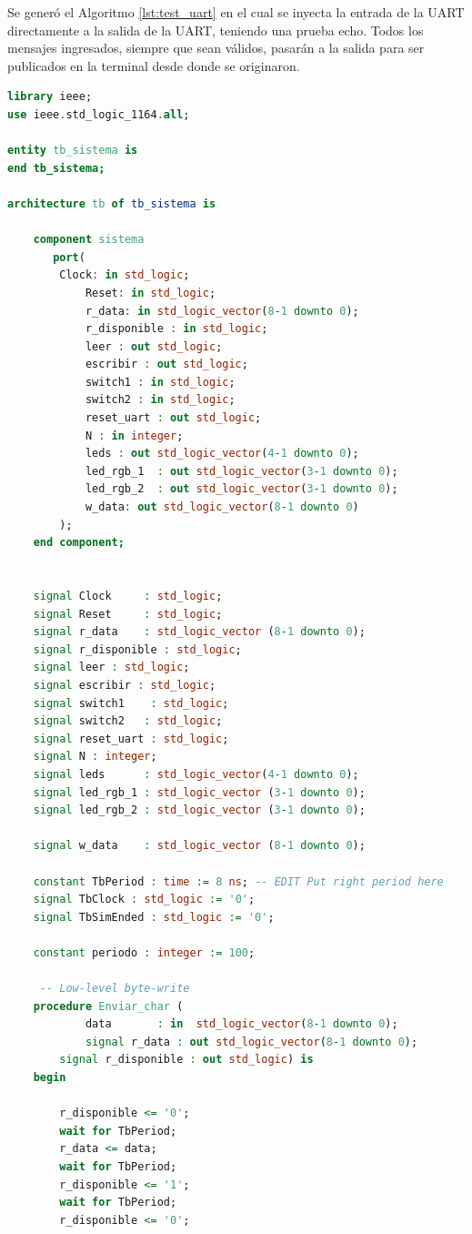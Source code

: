 		Se generó el Algoritmo \ref{lst:test_uart} en el cual se inyecta la entrada de la UART directamente a la salida de la UART, teniendo una prueba echo. Todos los mensajes ingresados, siempre que sean válidos, pasarán a la salida para ser publicados en la terminal desde donde se originaron.
			
		\begin{lstlisting}[language = vhdl,caption=Testbench del módulo UART,label={lst:test_uart}] 
library ieee;
use ieee.std_logic_1164.all;

entity tb_sistema is
end tb_sistema;

architecture tb of tb_sistema is

    component sistema
       port(
		Clock: in std_logic;
        	Reset: in std_logic;
			r_data: in std_logic_vector(8-1 downto 0);
			r_disponible : in std_logic;
			leer : out std_logic;
			escribir : out std_logic;
			switch1 : in std_logic;
			switch2 : in std_logic;
			reset_uart : out std_logic;
			N : in integer;
			leds : out std_logic_vector(4-1 downto 0);
			led_rgb_1  : out std_logic_vector(3-1 downto 0);
			led_rgb_2  : out std_logic_vector(3-1 downto 0);
			w_data: out std_logic_vector(8-1 downto 0)
		);
    end component;


    signal Clock     : std_logic;
    signal Reset     : std_logic;
    signal r_data    : std_logic_vector (8-1 downto 0);
    signal r_disponible : std_logic;
    signal leer : std_logic;
    signal escribir : std_logic;
    signal switch1    : std_logic;
    signal switch2   : std_logic;
    signal reset_uart : std_logic;
    signal N : integer;
    signal leds      : std_logic_vector(4-1 downto 0);
    signal led_rgb_1 : std_logic_vector (3-1 downto 0);
    signal led_rgb_2 : std_logic_vector (3-1 downto 0);

    signal w_data    : std_logic_vector (8-1 downto 0);

    constant TbPeriod : time := 8 ns; -- EDIT Put right period here
    signal TbClock : std_logic := '0';
    signal TbSimEnded : std_logic := '0';

    constant periodo : integer := 100;

	 -- Low-level byte-write
  	procedure Enviar_char (
    		data       : in  std_logic_vector(8-1 downto 0);
    		signal r_data : out std_logic_vector(8-1 downto 0);
		signal r_disponible : out std_logic) is
  	begin

   		r_disponible <= '0';
		wait for TbPeriod;
        r_data <= data;
		wait for TbPeriod;
		r_disponible <= '1';
		wait for TbPeriod;
		r_disponible <= '0';


\end{lstlisting}
